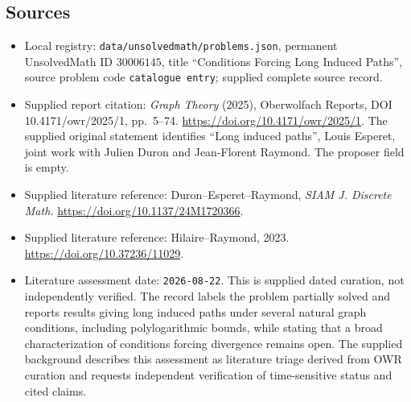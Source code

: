 \documentclass[11pt]{article}
\begin{document}
\subsection{Sources}
\begin{itemize}
\item Local registry: \texttt{data/unsolvedmath/problems.json}, permanent UnsolvedMath ID $30006145$, title ``Conditions Forcing Long Induced Paths'', source problem code \texttt{catalogue entry}; supplied complete source record.
\item Supplied report citation: \emph{Graph Theory} (2025), Oberwolfach Reports, DOI 10.4171/owr/2025/1, pp.~5--74. \url{https://doi.org/10.4171/owr/2025/1}. The supplied original statement identifies ``Long induced paths'', Louis Esperet, joint work with Julien Duron and Jean-Florent Raymond. The proposer field is empty.
\item Supplied literature reference: Duron--Esperet--Raymond, \emph{SIAM J. Discrete Math.} \url{https://doi.org/10.1137/24M1720366}.
\item Supplied literature reference: Hilaire--Raymond, 2023. \url{https://doi.org/10.37236/11029}.
\item Literature assessment date: \texttt{2026-08-22}. This is supplied dated curation, not independently verified. The record labels the problem partially solved and reports results giving long induced paths under several natural graph conditions, including polylogarithmic bounds, while stating that a broad characterization of conditions forcing divergence remains open. The supplied background describes this assessment as literature triage derived from OWR curation and requests independent verification of time-sensitive status and cited claims.
\end{itemize}
\end{document}
